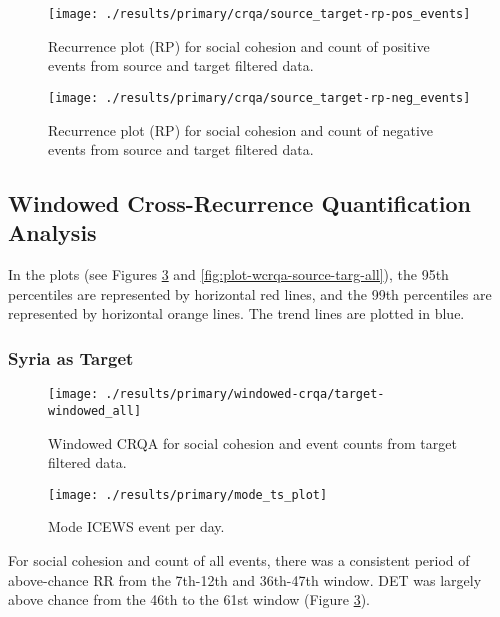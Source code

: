 \documentclass[english,man]{apa6}
\begin{document}
\begin{figure}
\texttt{[image: ./results/primary/crqa/source\_target-rp-pos\_events]} \caption{Recurrence plot (RP) for social cohesion and count of positive events from source and target filtered data.}\label{fig:plot-rp-source-targ-pos}
\end{figure}

\begin{figure}
\texttt{[image: ./results/primary/crqa/source\_target-rp-neg\_events]} \caption{Recurrence plot (RP) for social cohesion and count of negative events from source and target filtered data.}\label{fig:plot-rp-source-targ-neg}
\end{figure}

\hypertarget{windowed-cross-recurrence-quantification-analysis-1}{%
\subsection{Windowed Cross-Recurrence Quantification Analysis}\label{windowed-cross-recurrence-quantification-analysis-1}}

In the plots (see Figures \ref{fig:plot-wcrqa-targ-all} and
\ref{fig:plot-wcrqa-source-targ-all}), the 95th percentiles are represented
by horizontal red lines, and the 99th percentiles are
represented by horizontal orange lines. The trend lines are plotted in blue.

\hypertarget{syria-as-target-1}{%
\subsubsection{Syria as Target}\label{syria-as-target-1}}

\begin{figure}
\texttt{[image: ./results/primary/windowed-crqa/target-windowed\_all]} \caption{Windowed CRQA for social cohesion and event counts from target filtered data.}\label{fig:plot-wcrqa-targ-all}
\end{figure}

\begin{figure}
\texttt{[image: ./results/primary/mode\_ts\_plot]} \caption{Mode ICEWS event per day.}\label{fig:plot-mode-event}
\end{figure}

For social cohesion and count of all events, there was a consistent period
of above-chance RR from the 7th-12th and 36th-47th window. DET was largely
above chance from the 46th to the 61st window
(Figure \ref{fig:plot-wcrqa-targ-all}).
\end{document}
